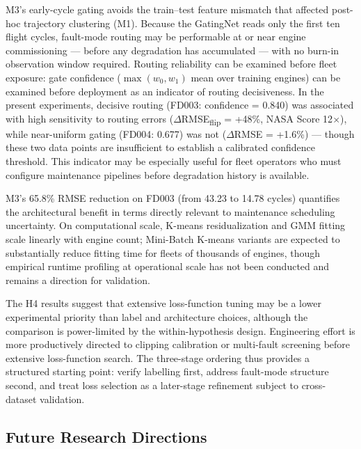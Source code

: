 \documentclass[review,12pt]{elsarticle}
\begin{document}
M3's early-cycle gating avoids the train--test feature mismatch that affected post-hoc trajectory clustering (M1). Because the GatingNet reads only the first ten flight cycles, fault-mode routing may be performable at or near engine commissioning --- before any degradation has accumulated --- with no burn-in observation window required. Routing reliability can be examined before fleet exposure: gate confidence ($\max(w_0, w_1)$ mean over training engines) can be examined before deployment as an indicator of routing decisiveness. In the present experiments, decisive routing (FD003: confidence = 0.840) was associated with high sensitivity to routing errors ($\Delta$RMSE\textsubscript{flip} = +48\%, NASA Score 12$\times$), while near-uniform gating (FD004: 0.677) was not ($\Delta$RMSE = +1.6\%) --- though these two data points are insufficient to establish a calibrated confidence threshold. This indicator may be especially useful for fleet operators who must configure maintenance pipelines before degradation history is available.

M3's 65.8\% RMSE reduction on FD003 (from 43.23 to 14.78 cycles) quantifies the architectural benefit in terms directly relevant to maintenance scheduling uncertainty. On computational scale, K-means residualization and GMM fitting scale linearly with engine count; Mini-Batch K-means variants are expected to substantially reduce fitting time for fleets of thousands of engines, though empirical runtime profiling at operational scale has not been conducted and remains a direction for validation.

The H4 results suggest that extensive loss-function tuning may be a lower experimental priority than label and architecture choices, although the comparison is power-limited by the within-hypothesis design. Engineering effort is more productively directed to clipping calibration or multi-fault screening before extensive loss-function search. The three-stage ordering thus provides a structured starting point: verify labelling first, address fault-mode structure second, and treat loss selection as a later-stage refinement subject to cross-dataset validation.

\subsection{Future Research Directions}
\end{document}
